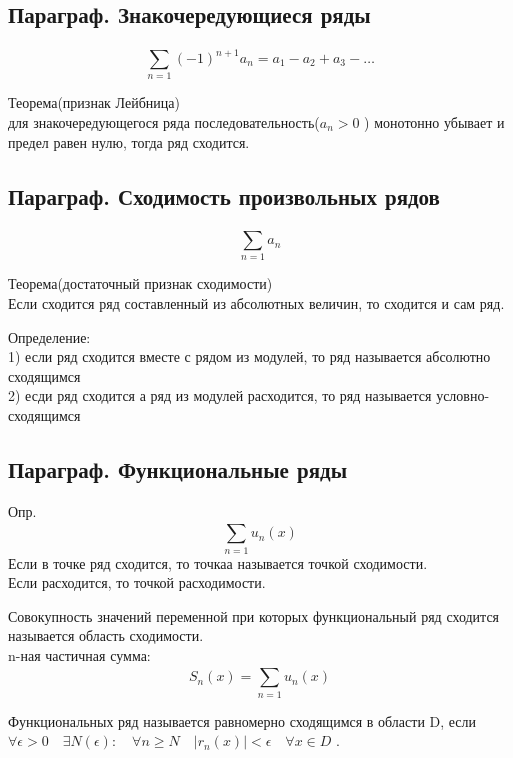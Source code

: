 \documentclass[a4paper, 12pt]{article}
\begin{document}
\subsection{Параграф. Знакочередующиеся ряды}
\[
  \sum_{n=1}^{} (-1)^{n+1} a_n = a_1 - a_2 + a_3 - \ldots 
\]
\begin{mdframed}[backgroundcolor=blue!20] 
       Теорема(признак Лейбница)\\
       для знакочередующегося ряда последовательность($ a_n > 0 $ ) монотонно убывает и предел равен нулю, тогда ряд сходится.\\
    \end{mdframed}
\subsection{Параграф. Сходимость произвольных рядов}
\[
  \sum_{n=1}^{} a_n  
\]
\begin{mdframed}[backgroundcolor=blue!20] 
       Теорема(достаточный признак сходимости)\\
       Если сходится ряд составленный из абсолютных величин, то сходится и сам ряд.
    \end{mdframed}
Определение:\\
1) если ряд сходится вместе с рядом из модулей, то ряд называется абсолютно сходящимся\\
2) есди ряд сходится а ряд из модулей расходится, то ряд называется условно-сходящимся\\

\subsection{Параграф. Функциональные ряды}
Опр. 
\[
  \sum_{n=1}^{} u_n(x)  
\]
Если в точке ряд сходится, то точкаа называется точкой сходимости.\\
Если расходится, то точкой расходимости.

Совокупность значений переменной при которых функциональный ряд сходится называется область сходимости.\\
n-ная частичная сумма:
\[
  S_n(x) = \sum_{n=1}^{} u_n(x)  
\]

Функциональных ряд называется равномерно сходящимся в области D, если $ \forall \epsilon > 0 \quad \exists N(\epsilon): \quad \forall n \geq N \quad |r_n(x)| < \epsilon \quad \forall x \in D $ .\\
\end{document}
